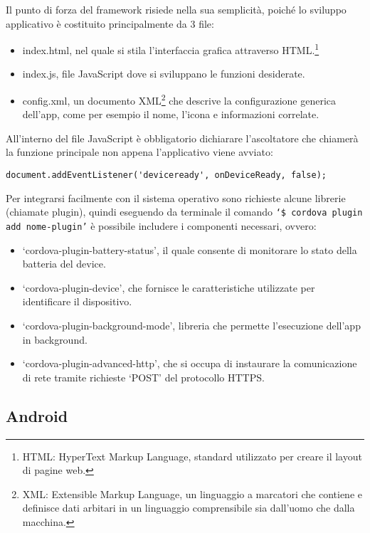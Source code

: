 \documentclass[target=bach]{thud}
\begin{document}
    Il punto di forza del framework risiede nella sua semplicità, poiché lo sviluppo applicativo è costituito principalmente da 3 file:
    \begin{itemize}
        \setlength{\itemsep}{1pt}
      \item index.html, nel quale si stila l'interfaccia grafica attraverso HTML.\footnote[6]{HTML: HyperText Markup Language, standard utilizzato per creare il layout di pagine web.}
      \item index.js, file JavaScript dove si sviluppano le funzioni desiderate.
      \item config.xml, un documento XML\footnote[7]{XML: Extensible Markup Language, un linguaggio a marcatori che contiene e definisce dati arbitari in un linguaggio comprensibile sia dall'uomo che dalla macchina.} che descrive la configurazione generica dell'app, come per esempio il nome, l'icona e informazioni correlate.
    \end{itemize}


    \newpage

    All'interno del file JavaScript è obbligatorio dichiarare l'ascoltatore che chiamerà la funzione principale non appena l'applicativo viene avviato:
\begin{lstlisting}
document.addEventListener('deviceready', onDeviceReady, false);
\end{lstlisting}

    Per integrarsi facilmente con il sistema operativo sono richieste alcune librerie (chiamate plugin), quindi eseguendo da terminale il comando \texttt{`\$ cordova plugin add {{nome-plugin}}'} è possibile includere i componenti necessari, ovvero:
    \begin{itemize}
        \setlength{\itemsep}{1pt}
        \item `cordova-plugin-battery-status', il quale consente di monitorare lo stato della batteria del device.
        \item `cordova-plugin-device', che fornisce le caratteristiche utilizzate per identificare il dispositivo.
        \item `cordova-plugin-background-mode', libreria che permette l'esecuzione dell'app in background.
        \item `cordova-plugin-advanced-http', che si occupa di instaurare la comunicazione di rete tramite richieste `POST' del protocollo HTTPS.
    \end{itemize}

    \subsection{Android}
\end{document}
